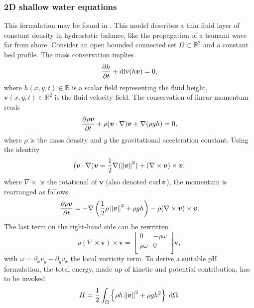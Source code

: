 \subsubsection{2D shallow water equations}\label{sec:shallowwater}
This formulation may be found in \cite[Section 6.2.]{cardoso2016}. This model describes a thin fluid layer of constant density in hydrostatic balance, like the propagation of a tsunami wave far from shore. Consider an open bounded connected set $\Omega \subset \mathbb{R}^2$ and a constant bed profile. The mass conservation implies
\begin{equation*}
\diffp{h}{t} + \div(h\bm{v}) = 0,
\end{equation*}
where $h(x,y,t) \in \mathbb{R}$ is a scalar field representing the fluid height, $\bm{v}(x,y,t) \in \mathbb{R}^2$ is the fluid velocity field. The conservation of linear momentum reads
\begin{equation*}
\diffp{\rho\bm{v}}{t} + \rho (\bm{v} \cdot \nabla) \bm{v} + \nabla(\rho g h) = 0,
\end{equation*}
where $\rho$ is the mass density and $g$ the gravitational acceleration constant. Using the identity
\begin{equation*}
(\bm{v} \cdot \nabla) \bm{v} = \frac{1}{2} \nabla(\left\|\bm{v}\right\|^2)  + (\nabla \times \bm{v}) \times \bm{v}, 
\end{equation*}
where $\nabla \times$ is the rotational of $\bm{v}$ (also denoted $\operatorname*{curl} \bm{v}$), the momentum is rearranged as follows
\begin{equation*}
\diffp{\rho \bm{v}}{t} = -\nabla\left(\frac{1}{2}\rho \norm{\bm{v}}^2 + \rho g h\right) - \rho (\nabla \times \bm{v}) \times \bm{v}.
\end{equation*}
The last term on the right-hand side can be rewritten
\begin{equation*}
\rho (\nabla \times \bm{v}) \times \bm{v} =   
\begin{bmatrix}
0 & -\rho\omega \\
\rho\omega & 0 \\
\end{bmatrix}
\bm{v},
\end{equation*}
with $\omega = \partial_x v_y - \partial_y v_x$ the local vorticity term. To derive a suitable pH formulation, the total energy, made up of kinetic and potential contribution, has to be invoked
\begin{equation*}
H = \frac{1}{2} \int_\Omega \left\{\rho h \norm{\bm{v}}^2 + \rho g h^2 \right\}  \d\Omega.
\end{equation*}
